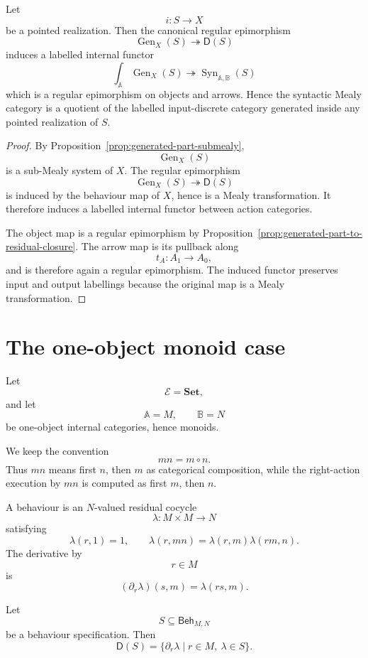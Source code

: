 \begin{theorem}
\label{thm:syntactic-quotient-generated-recognizers}
Let
\[
i:S\to X
\]
be a pointed realization. Then the canonical regular epimorphism
\[
\operatorname{Gen}_X(S)\twoheadrightarrow\mathsf D(S)
\]
induces a labelled internal functor
\[
\int_{\mathbb A}\operatorname{Gen}_X(S)
\twoheadrightarrow
\operatorname{Syn}_{\mathbb A,\mathbb B}(S)
\]
which is a regular epimorphism on objects and arrows. Hence the syntactic
Mealy category is a quotient of the labelled input-discrete category generated
inside any pointed realization of \(S\).
\end{theorem}

\begin{proof}
By Proposition~\ref{prop:generated-part-submealy},
\[
\operatorname{Gen}_X(S)
\]
is a sub-Mealy system of \(X\). The regular epimorphism
\[
\operatorname{Gen}_X(S)\twoheadrightarrow\mathsf D(S)
\]
is induced by the behaviour map of \(X\), hence is a Mealy transformation. It
therefore induces a labelled internal functor between action categories.

The object map is a regular epimorphism by
Proposition~\ref{prop:generated-part-to-residual-closure}. The arrow map is
its pullback along
\[
t_A:A_1\to A_0,
\]
and is therefore again a regular epimorphism. The induced functor preserves
input and output labellings because the original map is a Mealy
transformation.
\end{proof}

\section{The one-object monoid case}
\label{sec:canonical-residual-closure-one-object}

Let
\[
\mathcal E=\mathbf{Set},
\]
and let
\[
\mathbb A=M,
\qquad
\mathbb B=N
\]
be one-object internal categories, hence monoids.

We keep the convention
\[
mn=m\circ n.
\]
Thus \(mn\) means first \(n\), then \(m\) as categorical composition, while
the right-action execution by \(mn\) is computed as first \(m\), then \(n\).

A behaviour is an \(N\)-valued residual cocycle
\[
\lambda:M\times M\to N
\]
satisfying
\[
\lambda(r,1)=1,
\qquad
\lambda(r,mn)=\lambda(r,m)\lambda(rm,n).
\]
The derivative by
\[
r\in M
\]
is
\[
(\partial_r\lambda)(s,m)=\lambda(rs,m).
\]

\begin{proposition}
\label{prop:one-object-residual-closure}
Let
\[
S\subseteq \mathsf{Beh}_{M,N}
\]
be a behaviour specification. Then
\[
\mathsf D(S)
=
\{\partial_r\lambda\mid r\in M,\ \lambda\in S\}.
\]
\end{proposition}

